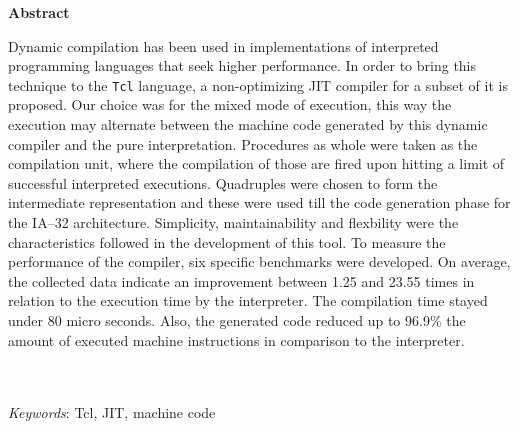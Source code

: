 
{
\Large
\begin{center}
\textbf{Abstract}
\end{center}
}
Dynamic compilation has been used in implementations of interpreted
programming languages that seek higher performance. In order to bring
this technique to the \texttt{Tcl} language, a non-optimizing JIT
compiler for a subset of it is proposed.
Our choice was for the mixed mode of execution, this way the execution
may alternate between the machine code generated by this dynamic compiler
and the pure interpretation.
Procedures as whole were taken as the compilation unit, where the
compilation of those are fired upon hitting a limit of successful interpreted
executions. Quadruples were chosen to form the intermediate representation
and these were used till the code generation phase for the IA--32
architecture.
Simplicity, maintainability and flexbility were the
characteristics followed in the development of this tool.
To measure the performance of the compiler, six specific benchmarks
were developed. On average, the collected data indicate an improvement
between 1.25 and 23.55 times in relation to the execution time by the
interpreter. The compilation time stayed under 80 micro seconds. Also,
the generated code reduced up to 96.9\% the amount of executed machine
instructions in comparison to the interpreter.

\quad\\
\quad\\
\textit{Keywords}: Tcl, JIT, machine code

\pagebreak
